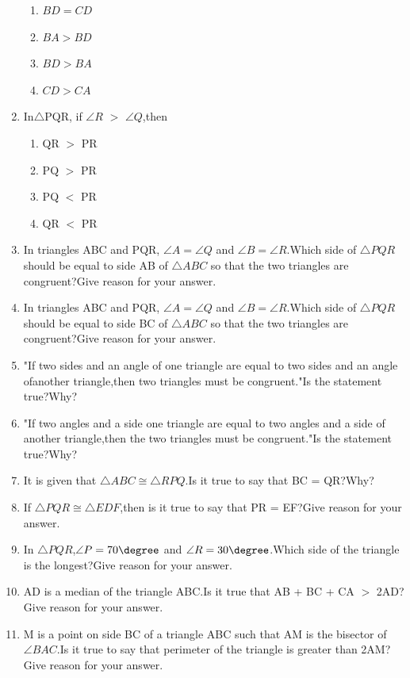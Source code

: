 \begin{enumerate}[label=\arabic*.,ref=\thesubsection.\theenumi]
\begin{enumerate}
\item $BD=CD$
\item $BA>BD$
\item $BD>BA$
\item $CD>CA$
\end{enumerate}
\item In$\triangle$PQR, if $\angle R$ $>$ $\angle Q$,then
\begin{enumerate}
\item QR $>$ PR
\item PQ $>$ PR
\item PQ $<$ PR
\item QR $<$ PR
\end{enumerate}
\item In triangles ABC and PQR, $ \angle{A} = \angle{Q} $ and $ \angle{B} = \angle{R} $.Which side of $ \triangle{PQR} $ should be equal to side AB of $ \triangle{ABC} $ so that the two triangles are congruent?Give reason for your answer.

\item In triangles ABC and PQR, $ \angle{A} = \angle{Q} $ and $ \angle{B} = \angle{R} $.Which side of $ \triangle{PQR} $should be equal to side BC of $ \triangle{ABC} $ so that the two triangles are congruent?Give reason for your answer.

\item "If two sides and an angle of one triangle are equal to two sides and an angle ofanother triangle,then two triangles must be congruent."Is the statement true?Why?

\item "If two angles and a side one triangle are equal to two angles and a side of another triangle,then the two triangles must be congruent."Is the statement true?Why?
\item It is given that $ \triangle{ABC} \cong \triangle{RPQ} $.Is it true to say that BC = QR?Why?

\item If $ \triangle{PQR} \cong \triangle{EDF} $,then is it true to say that PR = EF?Give reason for your answer.

\item In $ \triangle{PQR} $,$ \angle{P} = 70\degree $ and $ \angle{R} = 30\degree $.Which side of the triangle is the longest?Give reason for your answer.

\item AD is a median of the triangle ABC.Is it true that AB + BC + CA $ > $ 2AD?Give reason for your answer.

\item M is a point on side BC of a triangle ABC such that AM is the bisector of $ \angle{BAC} $.Is it true to say that perimeter of the triangle is greater than 2AM?Give reason for your answer.


\end{enumerate}


